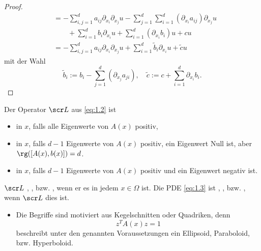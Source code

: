 \begin{df}
\begin{note}
\begin{itemize}
\begin{proof}
\begin{align*}
						&= -\sum_{i,j=1}^d a_{ij} \partial_{x_i} \partial_{x_j} u - \sum_{j=1}^d \sum_{i=1}^d (\partial_{x_i} a_{ij}) \partial_{x_j} u \\
						&\qquad + \sum_{i=1}^d b_i \partial_{x_i} u + \sum_{i=1}^d (\partial_{x_i} b_i) u + cu \\
						&= - \sum_{i,j=1}^d a_{ij} \partial_{x_i} \partial_{x_j} u + \sum_{i=1}^d \tilde b_i \partial_{x_i} u + \tilde c u
					\end{align*}
					mit der Wahl
					\[
						\tilde b_i := b_i - \sum_{j=1}^d (\partial_{x_j} a_{ji}),
						\quad
						\tilde c := c + \sum_{i=1}^d \partial_{x_i} b_i.
					\]
				\end{proof}
		\end{itemize}
	\end{note}
\end{df}

\begin{df}[Klassifikation] \label{1.15}
	Der Operator $\scr L$ aus \eqref{eq:1.2} ist
	\begin{itemize}
		\item
			 in $x$, falls alle Eigenwerte von $A(x)$ positiv,
		\item
			 in $x$, falls $d-1$ Eigenwerte von $A(x)$ positiv, ein Eigenwert Null ist, aber $\rg([A(x),b(x)]) = d$.
		\item
			 in $x$, falls $d-1$ Eigenwerte von $A(x)$ positiv und ein Eigenwert negativ ist.
	\end{itemize}
	$\scr L$ , , bzw. , wenn er es in jedem $x \in \Omega$ ist.
	Die PDE \eqref{eq:1.3} ist , , bzw. , wenn $\scr L$ dies ist.
	\begin{note}
		\begin{itemize}
			\item
				Die Begriffe sind motiviert aus Kegelschnitten oder Quadriken, denn
				\[
					z^T A(x) z = 1
				\]
				beschreibt unter den genannten Voraussetzungen ein Ellipsoid, Paraboloid, bzw. Hyperboloid.
		\end{itemize}
	\end{note}
\end{df}


